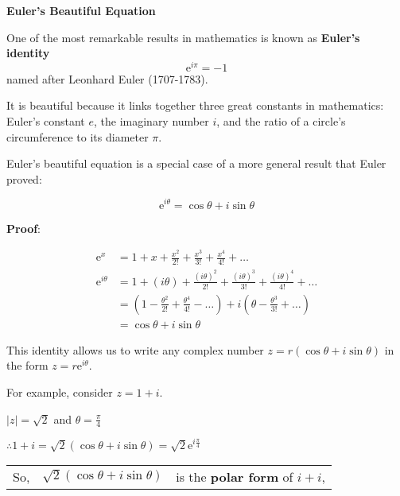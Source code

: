 \documentclass[11pt,a4paper]{book}
\begin{document}
\begin{tcolorbox}[colback=blue!5, colframe=black, boxrule=.4pt, sharpish corners]

\begin{tcolorbox}[skin=enhancedlast, width=\textwidth, interior style={left color=blue!5,right color=blue!35}, colframe=blue!35, arc=3mm, sharp corners=east,halign=right]

\textbf{\large{}Euler's Beautiful Equation}{\large\par}

\end{tcolorbox}

\medskip{}

One of the most remarkable results in mathematics is known as \textbf{Euler's identity}
\[
\mathrm{e}^{i\pi}=-1
\]
named after Leonhard Euler (1707-1783).

\medskip{}

It is beautiful because it links together three great constants in
mathematics: Euler's constant $e$, the imaginary number $i$, and
the ratio of a circle's circumference to its diameter $\pi$.
\end{tcolorbox}
Euler's beautiful equation is a special case of a more general result
that Euler proved:

\[
\mathrm{e}^{i\theta}=\cos\theta+i\sin\theta
\]

\textbf{Proof}:

\begin{align*}
\mathrm{e}^{x} & =1+x+\frac{x^{2}}{2!}+\frac{x^{3}}{3!}+\frac{x^{4}}{4!}+\ldots\\
\mathrm{e}^{i\theta} & =1+\left(i\theta\right)+\frac{\left(i\theta\right)^{2}}{2!}+\frac{\left(i\theta\right)^{3}}{3!}+\frac{\left(i\theta\right)^{4}}{4!}+\ldots\\
 & =\left(1-\frac{\theta^{2}}{2!}+\frac{\theta^{4}}{4!}-\ldots\right)+i\left(\theta-\frac{\theta^{3}}{3!}+\ldots\right)\\
 & =\cos\theta+i\sin\theta
\end{align*}

This identity allows us to write any complex number $z=r\left(\cos\theta+i\sin\theta\right)$
in the form $z=r\mathrm{e}^{i\theta}$.

For example, consider $z=1+i$.

$\left|z\right|=\sqrt{2}$ and ${\displaystyle \theta=\frac{\pi}{4}}$

${\displaystyle \therefore1+i=\sqrt{2}\left(\cos\theta+i\sin\theta\right)=\sqrt{2}\mathrm{e}^{i\frac{\pi}{4}}}$
\begin{center}
\begin{tabular}[t]{>{\raggedright}p{0.8cm}>{\raggedright}p{3cm}>{\raggedright}p{6cm}}
So, & $\sqrt{2}\left(\cos\theta+i\sin\theta\right)$ & is the \textbf{polar form} of $i+i$,\tabularnewline
\end{tabular}
\par\end{center}
\end{document}
